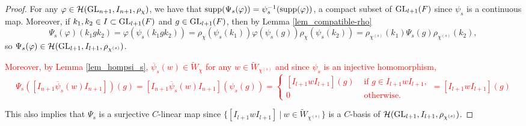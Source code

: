     \begin{proof}
        For any $\varphi\in\mathcal{H}(\mathrm{GL}_{n+1},I_{n+1},\rho_\chi)$, we have that $\mathrm{supp}(\Psi_s(\varphi))=\psi_s^{-1}(\mathrm{supp}(\varphi))$, a compact subset of $\mathrm{GL}_{l+1}(F)$ since $\psi_s$ is a continuous map. Moreover, if $k_1,k_2\in I\subset\mathrm{GL}_{l+1}(F)$ and $g\in\mathrm{GL}_{l+1}(F)$, then by Lemma \ref{lem_compatible-rho}
        $$\Psi_s(\varphi)(k_1gk_2)=\varphi(\psi_s(k_1gk_2))=\rho_\chi(\psi_s(k_1))\varphi(\psi_s(g))\rho_\chi(\psi_s(k_2))=\rho_{\chi^{(s)}}(k_1)\Psi_s(g)\rho_{\chi^{(s)}}(k_2),$$
        so $\Psi_s(\varphi)\in\mathcal{H}(\mathrm{GL}_{l+1},I_{l+1},\rho_{\chi^{(s)}})$.

        \textcolor{red}{Moreover, by Lemma \ref{lem_hompsi_s}, $\overline{\psi}_s(w)\in \widetilde{W}_{\chi}$ for any $w\in\widetilde{W}_{\chi^{(s)}}$ and since $\psi_s$ is an injective homomorphism,
        \begin{equation*}
            \Psi_s\left([I_{n+1}\overline{\psi}_s(w)I_{n+1}]\right)(g)=[I_{n+1}\overline{\psi}_s(w)I_{n+1}](\psi_s(g))=
            \begin{cases}
                [I_{l+1}wI_{l+1}](g)&\text{ if }g\in I_{l+1}wI_{l+1},\\
                0 &\text{ otherwise}.
            \end{cases}
            =[I_{l+1}wI_{l+1}](g)
        \end{equation*}}
        
        This also implies that $\Psi_s$ is a surjective $C$-linear map since $\{[I_{l+1}wI_{l+1}]\ |\ w\in\widetilde{W}_{\chi^{(s)}}\}$ is a $C$-basis of $\mathcal{H}(\mathrm{GL}_{l+1},I_{l+1},\rho_{\chi^{(s)}})$.


\end{proof}
